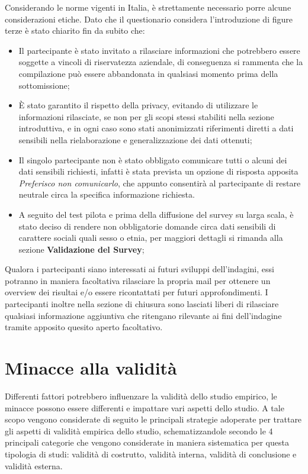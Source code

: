     Considerando le norme vigenti in Italia, è strettamente necessario porre alcune considerazioni etiche.
    Dato che il questionario considera l'introduzione di figure terze è stato chiarito fin da subito che:
    \begin{itemize}
        \item  Il partecipante è stato invitato a rilasciare informazioni che potrebbero essere soggette a vincoli di riservatezza aziendale, di conseguenza si rammenta che la compilazione può essere abbandonata in qualsiasi momento prima della sottomissione;
        \item È stato garantito il rispetto della privacy, evitando di utilizzare le informazioni rilasciate, se non per gli scopi stessi stabiliti nella sezione introduttiva, e in ogni caso sono stati anonimizzati riferimenti diretti a dati sensibili nella rielaborazione e generalizzazione dei dati ottenuti;
        \item Il singolo partecipante non è stato obbligato comunicare tutti o alcuni dei dati sensibili richiesti, infatti è stata prevista un opzione di risposta apposita \emph{Preferisco non comunicarlo}, che appunto consentirà al partecipante di restare neutrale circa la specifica informazione richiesta.
        \item A seguito del test pilota e prima della diffusione del survey su larga scala, è stato deciso di rendere non obbligatorie domande circa dati sensibili di carattere sociali quali sesso o etnia, per maggiori dettagli si rimanda alla sezione \textbf{Validazione del Survey};
    \end{itemize}
    
    Qualora i partecipanti siano interessati ai futuri sviluppi dell'indagini, essi potranno in maniera facoltativa rilasciare la propria mail per ottenere un overview dei risultai e/o essere ricontattati per futuri approfondimenti. I partecipanti inoltre nella sezione di chiusura sono lasciati liberi di rilasciare qualsiasi informazione aggiuntiva che ritengano rilevante ai fini dell'indagine tramite apposito quesito aperto facoltativo.
    
    

   
   
   
    
   

    
\section{Minacce alla validità}
Differenti fattori potrebbero influenzare la validità dello studio empirico, le minacce possono essere differenti e impattare vari aspetti dello studio. A tale scopo vengono considerate di seguito le principali strategie adoperate per trattare gli aspetti di validità empirica dello studio, schematizzandole secondo le 4 principali categorie che vengono considerate in maniera sistematica per questa tipologia di studi: validità di costrutto, validità interna, validità di conclusione e validità esterna.

